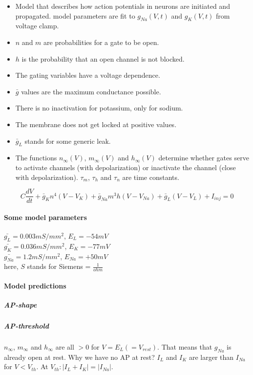 \documentclass[main]{subfiles}
\begin{document}
\begin{itemize}
	\item Model that describes how action potentials in neurons are initiated and propagated.
	\subitem model parameters are fit to $g_{Na}(V,t)$ and $g_K(V,t)$ from voltage clamp.
	\item $n$ and $m$ are probabilities for a gate to be open.
	\item $h$ is the probability that an open channel is not blocked.
	\item The gating variables have a voltage dependence.
	\item $\bar{g}$ values are the maximum conductance possible.
	\item There is no inactivation for potassium, only for sodium.
	\item The membrane does not get locked at positive values.
	\item $\bar{g}_L$ stands for some generic leak.
	\item The functions $n_\infty(V)$, $m_\infty(V)$ and $h_\infty(V)$ determine whether gates serve to activate channels (with depolarization) or inactivate the channel (close with depolarization). $\tau_m$, $\tau_h$ and $\tau_n$ are time constants.
\end{itemize}

\[C\frac{dV}{dt}+\bar{g}_Kn^4(V-V_K)+\bar{g}_{Na}m^3h(V-V_{Na})+\bar{g}_L(V-V_L)+I_{inj}=0\]

\paragraph{Some model parameters}
$\bar{g_L} = 0.003 mS/mm^2$, $E_L = -54mV$\\
$\bar{g_K} = 0.036 mS/mm^2$, $E_K = -77mV$\\
$\bar{g_{Na}} = 1.2 mS/mm^2$, $E_{Na} = +50mV$\\
here, $S$ stands for Siemens = $\frac{1}{ohm}$

\paragraph{Model predictions}
\subparagraph{AP-shape}

\subparagraph{AP-threshold}
$n_\infty$, $m_\infty$ and $h_\infty$ are all $> 0$ for $V = E_L (= V_{rest})$.
That means that $g_{Na}$ is already open at rest.
Why we have no AP at rest? $I_L$ and $I_K$ are larger than $I_{Na}$ for $V < V_{th}$. At $V_{th}: |I_L + I_{K}| = |I_{Na}|$.
\end{document}
